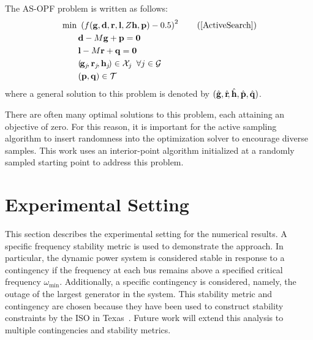 \documentclass[lettersize,journal]{IEEEtran}
\begin{document}
The AS-OPF problem is written as follows:
\begin{subequations}\label{ActiveSearch}
\begin{align} 
& \min \  \left(f(\bold{g},\bold{d},\bold{r},\bold{l},Z\bold{h},\bold{p})-0.5\right)^2 \tag{\ref{ActiveSearch}}\label{TSCOPFactive}\\
&  \hspace{20pt} \bold{d}-M\bold{g}+\bold{p}= \mathbf{0}
\label{rpowerbalanceactive}\\
& \hspace{20pt} \bold{l}-M\bold{r}+\bold{q}= \mathbf{0} 
\label{qpowerbalanceactive}\\
&\hspace{20pt}(\!\bold{g}_{j}\!,\bold{r}_{j}\!,\bold{h}_{j}\!)\in\mathcal{X}_j \hspace{5pt} \forall j \in \mathcal{G}\\
&\hspace{20pt}(\bold{p},\bold{q})\in\mathcal{T}
\end{align}\end{subequations}
where a general solution to this problem is denoted by $(\hat{\bold{g}},\hat{\bold{r}}\!,\hat{\bold{h}},\hat{\bold{p}},\hat{\bold{q}})$.

There are often many optimal solutions to this problem, each attaining an objective of zero.  For this reason, it is important for the active sampling algorithm to insert randomness into the optimization solver to encourage diverse samples.  This work uses an interior-point algorithm initialized at a randomly sampled starting point to address this problem.

\section{Experimental Setting}
This section describes the experimental setting for the numerical results. A specific frequency stability metric is used to demonstrate the approach.  In particular, the dynamic power system is considered stable in response to a contingency if the frequency at each bus remains above a specified critical frequency $\omega_{\min}$.  Additionally, a specific contingency is considered, namely, the outage of the largest generator in the system.  This stability metric and contingency are chosen because they have been used to construct stability constraints by the ISO in Texas~\cite{li2018design,liu2018participation}. Future work will extend this analysis to multiple contingencies and stability metrics.
\end{document}
